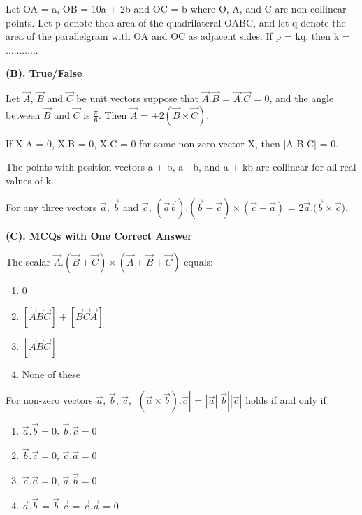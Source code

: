 \item Let OA = a, OB = 10a + 2b and OC = b where O, A, and C are non-collinear points. Let p denote thea area of the quadrilateral OABC, and let q denote the area of the parallelgram with OA and OC as adjacent sides. If p = kq, then k = ............

\textbf{(B). True/False}

\item Let $\overrightarrow{A}$, $\overrightarrow{B}$ and $\overrightarrow{C}$ be unit vectors suppose that $\overrightarrow{A}.\overrightarrow{B}$ = $\overrightarrow{A}.\overrightarrow{C}$ = 0, and the angle between $\overrightarrow{B}$ and $\overrightarrow{C}$ is $\frac{\pi}{6}$. Then $\overrightarrow{A}$ = $\pm 2(\overrightarrow{B} \times \overrightarrow{C})$.

\item If X.A = 0, X.B = 0, X.C = 0 for some non-zero vector X, then [A B C] = 0.

\item The points with position vectors a + b, a - b, and a + kb are collinear for all real values of k.

\item For any three vectors $\overrightarrow{a}$, $\overrightarrow{b}$ and $\overrightarrow{c}$, $(\overrightarrow{a}  \overrightarrow{b}) . (\overrightarrow{b} - \overrightarrow{c}) \times (\overrightarrow{c} - \overrightarrow{a})$ = 2$\overrightarrow{a} . (\overrightarrow{b} \times \overrightarrow{c}$).

\textbf{(C). MCQs with One Correct Answer}
\item The scalar $\overrightarrow{A} . (\overrightarrow{B} + \overrightarrow{C}) \times (\overrightarrow{A} + \overrightarrow{B} + \overrightarrow{C})$ equals:
\begin{enumerate}
\item 0
\item $[\overrightarrow{A}  \overrightarrow{B}  \overrightarrow{C}] + [\overrightarrow{B} \overrightarrow{C} \overrightarrow{A}]$
\item $[\overrightarrow{A} \overrightarrow{B} \overrightarrow{C}]$
\item None of these
\end{enumerate}

\item For non-zero vectors $\overrightarrow{a}$, $\overrightarrow{b}$, $\overrightarrow{c}$, $| (\overrightarrow{a} \times \overrightarrow{b}) .  \overrightarrow{c} |$ = $|\overrightarrow{a}||\overrightarrow{b}||\overrightarrow{c}|$ holds if and only if 
\begin{enumerate}
\item $\overrightarrow{a}.\overrightarrow{b} = 0$, $\overrightarrow{b}.\overrightarrow{c} = 0$
\item $\overrightarrow{b}.\overrightarrow{c} = 0$, $\overrightarrow{c}.\overrightarrow{a} = 0$
\item $\overrightarrow{c}.\overrightarrow{a} = 0$, $\overrightarrow{a}.\overrightarrow{b} = 0$
\item $\overrightarrow{a}.\overrightarrow{b}$ = $\overrightarrow{b}.\overrightarrow{c}$  = $\overrightarrow{c}.\overrightarrow{a}$ = 0
\end{enumerate}

